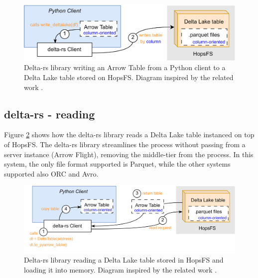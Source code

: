 \begin{figure}
    \begin{center}
      \includegraphics[width=\textwidth]{figures/2-background_and_related_work/delta_write.png}
    \end{center}
    \caption[delta-rs - write process]{Delta-rs library writing an Arrow Table from a Python client to a Delta Lake table stored on \gls{HopsFS}. Diagram inspired by the related work \cite{manfrediReducingReadWrite2024}.}
    \label{fig:delta_write}
\end{figure}



\subsection{delta-rs - reading}
\label{subsec:back_sys_delta_read}

Figure \ref{fig:delta_read} shows how the delta-rs library reads a Delta Lake table instanced on top of \gls{HopsFS}. The delta-rs library streamlines the process without passing from a server instance (Arrow Flight), removing the middle-tier from the process. In this system, the only file format supported is Parquet, while the other systems supported also ORC and Avro.

\begin{figure}
    \begin{center}
      \includegraphics[width=\textwidth]{figures/2-background_and_related_work/delta_read.png}
    \end{center}
    \caption[delta-rs - read process]{Delta-rs library reading a Delta Lake table stored in \gls{HopsFS} and loading it into memory. Diagram inspired by the related work \cite{manfrediReducingReadWrite2024}.}
    \label{fig:delta_read}
\end{figure}